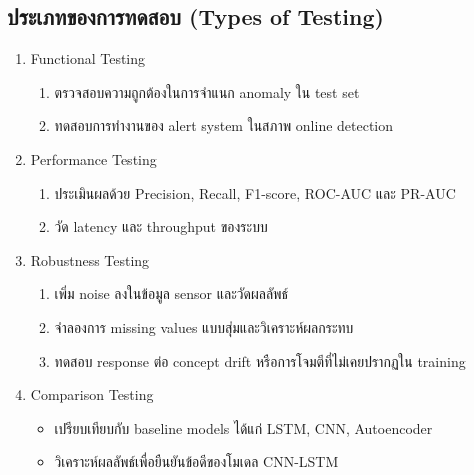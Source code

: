 \subsection{ประเภทของการทดสอบ (Types of Testing)}
\begin{enumerate}
    \item Functional Testing
    \begin{enumerate}
        \item ตรวจสอบความถูกต้องในการจำแนก anomaly ใน test set
        \item ทดสอบการทำงานของ alert system ในสภาพ online detection
    \end{enumerate}
    \item Performance Testing
    \begin{enumerate}
        \item ประเมินผลด้วย Precision, Recall, F1-score, ROC-AUC และ PR-AUC
        \item วัด latency และ throughput ของระบบ
    \end{enumerate}
    \item Robustness Testing
    \begin{enumerate}
        \item เพิ่ม noise ลงในข้อมูล sensor และวัดผลลัพธ์
        \item จำลองการ missing values แบบสุ่มและวิเคราะห์ผลกระทบ
        \item ทดสอบ response ต่อ concept drift หรือการโจมตีที่ไม่เคยปรากฏใน training
    \end{enumerate}
    \item Comparison Testing
    \begin{itemize}
        \item เปรียบเทียบกับ baseline models ได้แก่ LSTM, CNN, Autoencoder
        \item วิเคราะห์ผลลัพธ์เพื่อยืนยันข้อดีของโมเดล CNN-LSTM
    \end{itemize}
\end{enumerate}